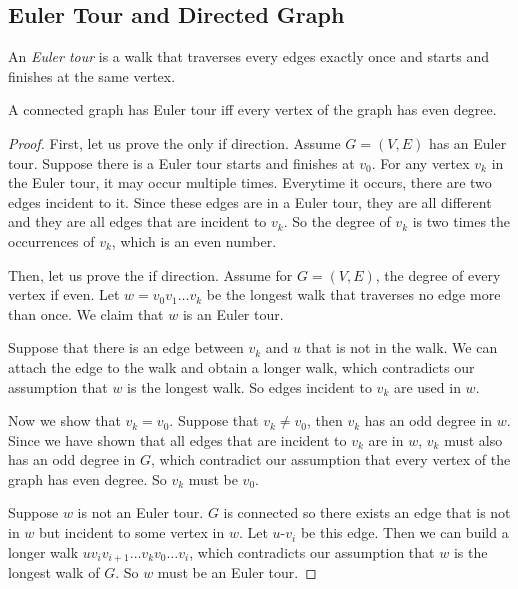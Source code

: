 \documentclass[11pt]{article}
\begin{document}
\subsection{Euler Tour and Directed Graph}

\begin{definition}
An \emph{Euler tour} is a walk that traverses every edges exactly once and starts and finishes at
the same vertex.
\end{definition}

\begin{theorem}
A connected graph has Euler tour iff every vertex of the graph has even degree.
\end{theorem}

\begin{proof}
First, let us prove the only if direction. Assume $G=(V,E)$ has an Euler tour. Suppose there is a
Euler tour starts and finishes at $v_0$. For any vertex $v_k$ in the Euler tour, it may occur
multiple times. Everytime it occurs, there are two edges incident to it. Since these edges are in
a Euler tour, they are all different and they are all edges that are incident to $v_k$. So the
degree of $v_k$ is two times the occurrences of $v_k$, which is an even number.

Then, let us prove the if direction. Assume for $G=(V,E)$, the degree of every vertex if even. Let
$w = v_0v_1 \dots v_k$ be the longest walk that traverses no edge more than once. We claim that
$w$ is an Euler tour.

Suppose that there is an edge between $v_k$ and $u$ that is not in the walk. We can attach the edge
to the walk and obtain a longer walk, which contradicts our assumption that $w$ is the longest
walk. So edges incident to $v_k$ are used in $w$.

Now we show that $v_k=v_0$. Suppose that $v_k \neq v_0$, then $v_k$ has an odd degree in $w$.
Since we have shown that all edges that are incident to $v_k$ are in $w$, $v_k$ must also has an
odd degree in $G$, which contradict our assumption that every vertex of the graph has even degree.
So $v_k$ must be $v_0$.

Suppose $w$ is not an Euler tour. $G$ is connected so there exists an edge that is not in $w$ but
incident to some vertex in $w$. Let $u$-$v_i$ be this edge. Then we can build a longer walk
$uv_iv_{i+1} \dots v_kv_0 \dots v_i$, which contradicts our assumption that $w$ is the longest walk
of $G$. So $w$ must be an Euler tour.
\end{proof}
\end{document}
